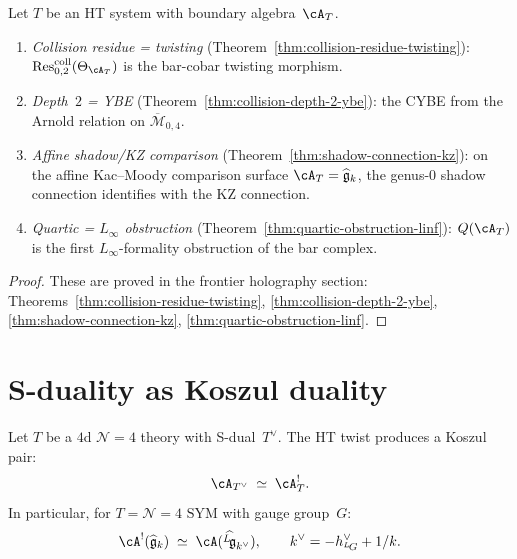 \begin{proposition}
\label{prop:ht-four-recovery}
Let $T$ be an HT system with boundary algebra~$\cA_T$.
\begin{enumerate}[label=\textup{(\roman*)}]
\item \emph{Collision residue = twisting}
 \textup{(}Theorem~\textup{\ref{thm:collision-residue-twisting}}\textup{)}:
 $\operatorname{Res}^{\mathrm{coll}}_{0,2}(\Theta_{\cA_T})$
 is the bar-cobar twisting morphism.
\item \emph{Depth~$2$ = YBE}
 \textup{(}Theorem~\textup{\ref{thm:collision-depth-2-ybe}}\textup{)}:
 the CYBE from the Arnold relation on
 $\overline{\mathcal{M}}_{0,4}$.
\item \emph{Affine shadow/KZ comparison}
 \textup{(}Theorem~\textup{\ref{thm:shadow-connection-kz}}\textup{)}:
 on the affine Kac--Moody comparison surface
 $\cA_T = \widehat{\mathfrak{g}}_k$, the genus-$0$ shadow
 connection identifies with the KZ connection.
\item \emph{Quartic = $L_\infty$ obstruction}
 \textup{(}Theorem~\textup{\ref{thm:quartic-obstruction-linf}}\textup{)}:
 $Q(\cA_T)$ is the first $L_\infty$-formality obstruction of the
 bar complex.
\end{enumerate}
\end{proposition}

\begin{proof}
These are proved in the frontier holography section:
Theorems~\ref{thm:collision-residue-twisting},
\ref{thm:collision-depth-2-ybe},
\ref{thm:shadow-connection-kz},
\ref{thm:quartic-obstruction-linf}.
\end{proof}

\section{S-duality as Koszul duality}
\label{sec:ht-s-duality-koszul}

\begin{conjecture}[S-duality = Koszul duality]
\ClaimStatusConjectured
\label{conj:ht-s-duality-koszul}
Let $T$ be a $4$d $\mathcal{N}=4$ theory with S-dual~$T^\vee$.
The HT twist produces a Koszul pair:
\begin{equation}\label{eq:ht-s-duality-koszul}
\cA_{T^\vee} \;\simeq\; \cA_T^!.
\end{equation}
In particular, for $T = \mathcal{N}=4$ $\mathrm{SYM}$ with gauge group~$G$:
\begin{equation}\label{eq:ht-langlands-koszul}
\cA^!(\widehat{\mathfrak{g}}_k)
\;\simeq\;
\cA(\widehat{{}^L\!\mathfrak{g}}_{k^\vee}),
\qquad
k^\vee = -h^\vee_{{}^L\!G} + 1/k.
\end{equation}
\end{conjecture}

